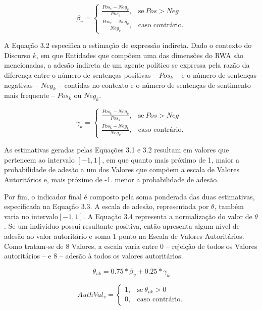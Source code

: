 \documentclass[
12pt,				%
openright,			%
twoside,			%
a4paper,			%
english,			%
french,				%
spanish,			%
brazil				%
]{abntex2}
\begin{document}
\begin{equation}
\beta_v = 
\begin{cases}
\frac{Pos_v - Neg_v}{Pos_v}, & \text{se}\ Pos > Neg \\
\frac{Pos_v - Neg_v}{Neg_v}, & \text{caso contrário.}
\end{cases}
\end{equation}

A Equação 3.2 especifica a estimação de expressão indireta. Dado o contexto do Discurso $k$, em que Entidades que compõem uma das dimensões do RWA são mencionadas, a adesão indireta de um agente político se expressa pela razão da diferença entre o número de sentenças positivas -- $Pos_k$ --  e o número de sentenças negativas -- $Neg_k$ -- contidas no contexto e o número de sentenças de sentimento mais frequente -- $Pos_k$ ou $Neg_k$.

\begin{equation}
\gamma_k = 
\begin{cases}
\frac{Pos_k - Neg_k}{Pos_k}, & \text{se}\ Pos > Neg \\
\frac{Pos_k - Neg_k}{Neg_k}, & \text{caso contrário.}
\end{cases}
\end{equation}

As estimativas geradas pelas Equações 3.1 e 3.2 resultam em valores que pertencem ao intervalo $[-1, 1]$, em que quanto mais próximo de 1, maior a probabilidade de adesão a um dos Valores que compõem a escala de Valores Autoritários e, mais próximo de -1. menor a probabilidade de adesão. 

Por fim, o indicador final é composto pela soma ponderada das duas estimativas, especificada na Equação 3.3. A escala de adesão, representada por $\theta$, também varia no intervalo$[-1, 1]$. A Equação 3.4 representa a normalização do valor de $\theta$. Se um indivíduo possui resultante positiva, então apresenta algum nível de adesão ao valor autoritário e soma 1 ponto na Escala de Valores Autoritários. Como tratam-se de 8 Valores, a escala varia entre 0 -- rejeição de todos os Valores autoritários -- e 8 -- adesão à todos os valores autoritários.

\begin{equation}
\theta_{vk} = 0.75 * \beta_v +  0.25 * \gamma_k
\end{equation}

\begin{equation}
AuthVal_v = 
\begin{cases}
1, & \text{se}\ \theta_{vk} > 0 \\
0, & \text{caso contrário.}
\end{cases}
\end{equation}
\end{document}
